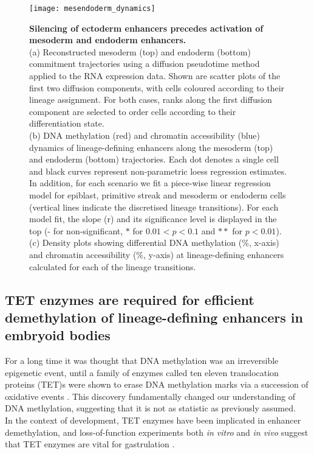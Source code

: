 \begin{figure}[H]
	\centering
	\texttt{[image: mesendoderm\_dynamics]}
	\caption[]{
	\textbf{Silencing of ectoderm enhancers precedes activation of mesoderm and endoderm enhancers.} \\
	(a) Reconstructed mesoderm (top) and endoderm (bottom) commitment trajectories using a diffusion pseudotime method applied to the RNA expression data. Shown are scatter plots of the first two diffusion components, with cells coloured according to their lineage assignment. For both cases, ranks along the first diffusion component are selected to order cells according to their differentiation state. \\
	(b) DNA methylation (red) and chromatin accessibility (blue) dynamics of lineage-defining enhancers along the mesoderm (top) and endoderm (bottom) trajectories. Each dot denotes a single cell and black curves represent non-parametric loess regression estimates. In addition, for each scenario we fit a piece-wise linear regression model for epiblast, primitive streak and mesoderm or endoderm cells (vertical lines indicate the discretised lineage transitions). For each model fit, the slope (r) and its significance level is displayed in the top (- for non-significant, $*$ for $0.01<p<0.1$ and $**$ for $p<0.01$).\\
	(c) Density plots showing differential DNA methylation (\%, x-axis) and chromatin accessibility (\%, y-axis) at lineage-defining enhancers calculated for each of the lineage transitions.
	}
	\label{fig:mesendoderm_dynamics}
\end{figure}


\subsection{TET enzymes are required for efficient demethylation of lineage-defining enhancers in embryoid bodies}

For a long time it was thought that DNA methylation was an irreversible epigenetic event, until a family of enzymes called ten eleven translocation proteins (TET)s were shown to erase DNA methylation marks via a succession of oxidative events \cite{Rasmussen2016}. This discovery fundamentally changed our understanding of DNA methylation, suggesting that it is not as statistic as previously assumed.\\
In the context of development, TET enzymes have been implicated in enhancer demethylation, and loss-of-function experiments both \textit{in vitro} and \textit{in vivo} suggest that TET enzymes are vital for gastrulation \cite{Dai2016,Sardina2018,Rasmussen2016,Li2016}.

